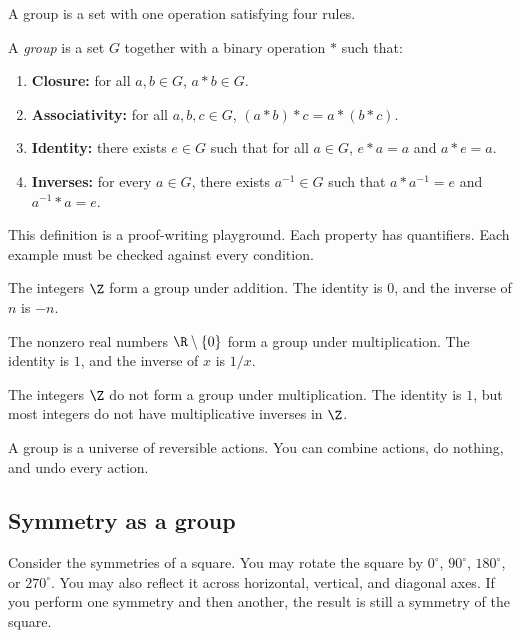 A group is a set with one operation satisfying four rules.

\begin{definition}
A \emph{group} is a set $G$ together with a binary operation $\ast$ such that:
\begin{enumerate}
\item \textbf{Closure:} for all $a,b\in G$, $a\ast b\in G$.
\item \textbf{Associativity:} for all $a,b,c\in G$,
$(a\ast b)\ast c=a\ast(b\ast c)$.
\item \textbf{Identity:} there exists $e\in G$ such that for all $a\in G$,
$e\ast a=a$ and $a\ast e=a$.
\item \textbf{Inverses:} for every $a\in G$, there exists $a^{-1}\in G$ such
that $a\ast a^{-1}=e$ and $a^{-1}\ast a=e$.
\end{enumerate}
\end{definition}

This definition is a proof-writing playground. Each property has quantifiers.
Each example must be checked against every condition.

\begin{example}
The integers $\Z$ form a group under addition. The identity is $0$, and the
inverse of $n$ is $-n$.
\end{example}

\begin{example}
The nonzero real numbers $\R\setminus\{0\}$ form a group under multiplication.
The identity is $1$, and the inverse of $x$ is $1/x$.
\end{example}

\begin{example}
The integers $\Z$ do not form a group under multiplication. The identity is $1$,
but most integers do not have multiplicative inverses in $\Z$.
\end{example}

\begin{intuitionbox}
A group is a universe of reversible actions. You can combine actions, do
nothing, and undo every action.
\end{intuitionbox}

\subsection{Symmetry as a group}

Consider the symmetries of a square. You may rotate the square by
$0^\circ$, $90^\circ$, $180^\circ$, or $270^\circ$. You may also reflect it
across horizontal, vertical, and diagonal axes. If you perform one symmetry and
then another, the result is still a symmetry of the square.

